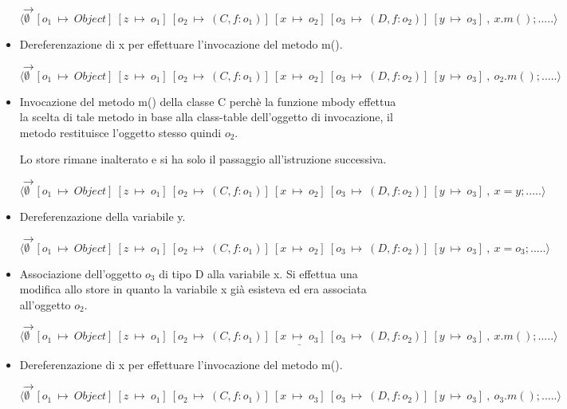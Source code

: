 \begin{itemize}
$\rightarrow$ $\langle\emptyset\:\:[o_1\:\mapsto\:Object]\:[z\:\mapsto\:o_1]\:[o_2\:\mapsto\:(C,f:o_1)]\:[x\:\mapsto\:o_2]\:[o_3\:\mapsto\:(D,f:o_2)]\:[y\:\mapsto\:o_3]\:,\:x.m();.....\rangle$

\vspace{0,5cm}
\item Dereferenzazione di x per effettuare l'invocazione del metodo m().

$\rightarrow$ $\langle\emptyset\:\:[o_1\:\mapsto\:Object]\:[z\:\mapsto\:o_1]\:[o_2\:\mapsto\:(C,f:o_1)]\:[x\:\mapsto\:o_2]\:[o_3\:\mapsto\:(D,f:o_2)]\:[y\:\mapsto\:o_3]\:,\:o_2.m();.....\rangle$

\vspace{0,5cm}
\item Invocazione del metodo m() della classe C perch\`e la funzione mbody effettua la scelta di tale metodo in base alla class-table dell'oggetto di invocazione, il metodo restituisce l'oggetto stesso quindi $o_2$.

Lo store rimane inalterato e si ha solo il passaggio all'istruzione successiva.

$\rightarrow$ $\langle\emptyset\:\:[o_1\:\mapsto\:Object]\:[z\:\mapsto\:o_1]\:[o_2\:\mapsto\:(C,f:o_1)]\:[x\:\mapsto\:o_2]\:[o_3\:\mapsto\:(D,f:o_2)]\:[y\:\mapsto\:o_3]\:,\:x=y;.....\rangle$

\vspace{0,5cm}
\item Dereferenzazione della variabile y.

$\rightarrow$ $\langle\emptyset\:\:[o_1\:\mapsto\:Object]\:[z\:\mapsto\:o_1]\:[o_2\:\mapsto\:(C,f:o_1)]\:[x\:\mapsto\:o_2]\:[o_3\:\mapsto\:(D,f:o_2)]\:[y\:\mapsto\:o_3]\:,\:x=o_3;.....\rangle$

\vspace{0,5cm}
\item Associazione dell'oggetto $o_3$ di tipo D alla variabile x. Si effettua una modifica allo store in quanto la variabile x gi\`a esisteva ed era associata all'oggetto $o_2$.

$\rightarrow$ $\langle\emptyset\:\:[o_1\:\mapsto\:Object]\:[z\:\mapsto\:o_1]\:[o_2\:\mapsto\:(C,f:o_1)]\:\underline{[x\:\mapsto\:o_3]}\:[o_3\:\mapsto\:(D,f:o_2)]\:[y\:\mapsto\:o_3]\:,\:x.m();.....\rangle$

\vspace{0,5cm}
\item Dereferenzazione di x per effettuare l'invocazione del metodo m().

$\rightarrow$ $\langle\emptyset\:\:[o_1\:\mapsto\:Object]\:[z\:\mapsto\:o_1]\:[o_2\:\mapsto\:(C,f:o_1)]\:[x\:\mapsto\:o_3]\:[o_3\:\mapsto\:(D,f:o_2)]\:[y\:\mapsto\:o_3]\:,\:o_3.m();.....\rangle$


\end{itemize}
